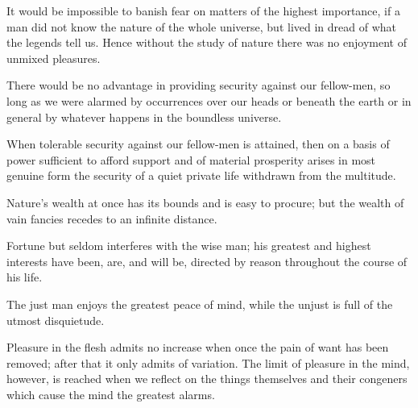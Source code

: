 \documentclass{stex}
\begin{document}
\vspace{0.5em}
\begin{sparagraph}[title=12]
  It would be impossible to banish fear on matters of the highest importance, if a man did not know the nature of the whole universe, but lived in dread of what the legends tell us.
  Hence without the study of nature there was no enjoyment of unmixed pleasures.
\end{sparagraph}

\vspace{0.5em}
\begin{sparagraph}[title=13]
  There would be no advantage in providing security against our fellow-men, so long as we were alarmed by occurrences over our heads or beneath the earth or in general by whatever happens in the boundless universe.
\end{sparagraph}

\vspace{0.5em}
\begin{sparagraph}[title=14]
  When tolerable security against our fellow-men is attained, then on a basis of power sufficient to afford support and of material prosperity arises in most genuine form the security of a quiet private life withdrawn from the multitude.
\end{sparagraph}

\vspace{0.5em}
\begin{sparagraph}[title=15]
  Nature's wealth at once has its bounds and is easy to procure; but the wealth of vain fancies recedes to an infinite distance.
\end{sparagraph}

\vspace{0.5em}
\begin{sparagraph}[title=16]
  Fortune but seldom interferes with the wise man; his greatest and highest interests have been, are, and will be, directed by reason throughout the course of his life.
\end{sparagraph}

\vspace{0.5em}
\begin{sparagraph}[title=17]
  The just man enjoys the greatest peace of mind, while the unjust is full of the utmost disquietude.
\end{sparagraph}

\vspace{0.5em}
\begin{sparagraph}[title=18]
  Pleasure in the flesh admits no increase when once the pain of want has been removed; after that it only admits of variation.
  The limit of pleasure in the mind, however, is reached when we reflect on the things themselves and their congeners which cause the mind the greatest alarms.
\end{sparagraph}
\end{document}
